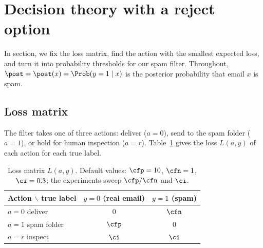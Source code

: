 \section{Decision theory with a reject option}
\label{sec:decision}

In section, we fix the loss matrix, find the action with the smallest expected loss,
and turn it into probability thresholds for our spam filter. Throughout,
$\post = \post(x) = \Prob(y=1\mid x)$ is the posterior probability that email $x$ is spam.

\subsection{Loss matrix}
\label{sec:loss-matrix}

The filter takes one of three actions: deliver ($a=0$), send to the spam folder ($a=1$), or hold for
human inspection ($a=r$). Table~\ref{tab:loss} gives the loss $L(a,y)$ of each action for each true label.

\begin{table}[ht]
\centering
\begin{tabular}{lcc}
\toprule
Action $\backslash$ true label & $y=0$ (real email) & $y=1$ (spam) \\
\midrule
$a=0$ deliver        & $0$     & $\cfn$ \\
$a=1$ spam folder    & $\cfp$  & $0$ \\
$a=r$ inspect        & $\ci$   & $\ci$ \\
\bottomrule
\end{tabular}
\caption{Loss matrix $L(a,y)$. Default values: $\cfp=10$, $\cfn=1$, $\ci=0.3$; the experiments sweep $\cfp/\cfn$ and $\ci$.}
\label{tab:loss}
\end{table}


